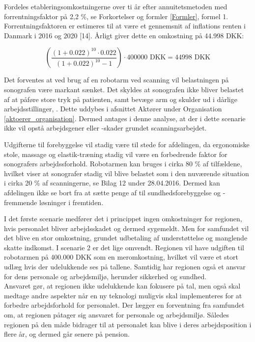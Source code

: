 Fordeles etableringsomkostningerne over ti år efter annuitetsmetoden med forrentningsfaktor på 2,2 \%, se Forkortelser og formler \ref{Formler}, formel 1. Forrentningsfaktoren er estimeres til at være et gennemsnit af inflations renten i Danmark i 2016 og 2020 [14]. Årligt giver dette en omkostning på 44.998 DKK:

\begin{equation}
\left(\frac{(1+0.022)^{10}\cdot0.022}{(1+0.022)^{10}-1}\right)\cdot400000 \text{ DKK}=44998 \text{ DKK}
\end{equation}

Det forventes at ved brug af en robotarm ved scanning vil belastningen på sonografen være markant sænket. Det skyldes at sonografen ikke bliver belastet af at påføre store tryk på patienten, samt bevæge arm og skulder ud i dårlige arbejdsstillinger, \cite{31}. Dette uddybes i afsnittet Aktører under Organisation \ref{aktoerer_organisation}. Dermed antages i denne analyse, at der i dette scenarie ikke vil opstå arbejdsgener eller -skader grundet scanningsarbejdet. 

Udgifterne til forebyggelse vil stadig være til stede for afdelingen, da ergonomiske stole, massage og elastik-træning stadig vil være en forbedrende faktor for sonografers arbejdssforhold. Robotarmen kan bruges i cirka 80 \% af tilfældene, hvilket viser at sonografer stadig vil blive belastet som i den nuværende situation i cirka 20 \% af scanningerne, se Bilag 12 under 28.04.2016. Dermed kan afdelingen ikke se bort fra at sætte penge af til sundhedsforebyggelse og - fremmende løsninger i fremtiden.  

I det første scenarie medfører det i princippet ingen omkostninger for regionen, hvis personalet bliver arbejdsskadet og dermed sygemeldt. Men for samfundet vil det blive en stor omkostning, grundet udbetaling af understøttelse og manglende skatte indkomst. I scenarie 2 er det lige omvendt. Regionen vil have udgiften til robotarmen på 400.000 DKK som en meromkostning, hvilket vil være et stort udlæg hvis der udelukkende ses på tallene. Samtidig har regionen også et ansvar for dens personale og arbejdsmiljø, herunder sikkerhed og sundhed. \\
Ansvaret gør, at regionen ikke udelukkende kan fokusere på tal, men også skal medtage andre aspekter når en ny teknologi muligvis skal implementeres for at forbedre arbejdsforhold for personalet. Der lægger en forventning fra samfundet om, at regionen påtager sig ansvaret for personale og arbejdsmiljø. Således regionen på den måde bidrager til at personalet kan blive i deres arbejdsposition i flere år, og dermed går senere på pension. 

